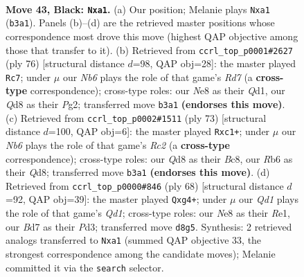 \documentclass[11pt]{article}
\begin{document}
\clearpage

\begin{figure}[p]\centering
\begin{subfigure}{0.46\textwidth}\centering
\resizebox{\linewidth}{!}{%
\newchessgame
\chessboard[
  setfen={B2qn3/3b2k1/pr6/P3Pp1p/3P2p1/NnQ5/5PPP/R3K1N1 b - - 0 43},
  showmover=false,
  pgfstyle=straightmove, color=movearrow, markmove={b3-a1}
]}
\caption{}
\end{subfigure}\hfill
\begin{subfigure}{0.46\textwidth}\centering
\resizebox{\linewidth}{!}{%
\newchessgame
\chessboard[
  setfen={6k1/3R1npp/2q2pn1/B1p4N/p1P1p3/r3P2P/5PP1/3Q2K1 w - - 0 39},
  showmover=false,
  pgfstyle=straightmove, color=movearrow, markmove={d7-c7}
]}
\caption{}
\end{subfigure}
\\[4pt]
\begin{subfigure}{0.46\textwidth}\centering
\resizebox{\linewidth}{!}{%
\newchessgame
\chessboard[
  setfen={2bq4/2r3k1/p2p1np1/1p1Pp1Np/1P2P3/PB6/3Q1PP1/2R3K1 b - - 1 37},
  showmover=false,
  pgfstyle=straightmove, color=movearrow, markmove={c7-c1}
]}
\caption{}
\end{subfigure}\hfill
\begin{subfigure}{0.46\textwidth}\centering
\resizebox{\linewidth}{!}{%
\newchessgame
\chessboard[
  setfen={6k1/3b1p2/r4q2/1pp2n2/3p1BpN/P2P2P1/5P2/3QR1K1 w - - 0 35},
  showmover=false,
  pgfstyle=straightmove, color=movearrow, markmove={d1-g4}
]}
\caption{}
\end{subfigure}
\caption{\textbf{Move 43, Black: \texttt{Nxa1}.} (a) Our position; Melanie plays \texttt{Nxa1} (\texttt{b3a1}). Panels (b)--(d) are the retrieved master positions whose correspondence most drove this move (highest QAP objective among those that transfer to it). (b) Retrieved from \texttt{ccrl\_top\_p0001\#2627} (ply 76) [structural distance $d$=98, QAP obj=28]: the master played \texttt{Rc7}; under $\mu$ our \emph{Nb6} plays the role of that game's \emph{Rd7} (a \textbf{cross-type} correspondence); cross-type roles: our \emph{N}e8 as their \emph{Q}d1, our \emph{Q}d8 as their \emph{P}g2; transferred move \texttt{b3a1} \textbf{(endorses this move)}. (c) Retrieved from \texttt{ccrl\_top\_p0002\#1511} (ply 73) [structural distance $d$=100, QAP obj=6]: the master played \texttt{Rxc1+}; under $\mu$ our \emph{Nb6} plays the role of that game's \emph{Rc2} (a \textbf{cross-type} correspondence); cross-type roles: our \emph{Q}d8 as their \emph{B}c8, our \emph{R}b6 as their \emph{Q}d8; transferred move \texttt{b3a1} \textbf{(endorses this move)}. (d) Retrieved from \texttt{ccrl\_top\_p0000\#846} (ply 68) [structural distance $d$=92, QAP obj=39]: the master played \texttt{Qxg4+}; under $\mu$ our \emph{Qd1} plays the role of that game's \emph{Qd1}; cross-type roles: our \emph{N}e8 as their \emph{R}e1, our \emph{B}d7 as their \emph{P}d3; transferred move \texttt{d8g5}. Synthesis: 2 retrieved analogs transferred to \texttt{Nxa1} (summed QAP objective 33, the strongest correspondence among the candidate moves); Melanie committed it via the \texttt{search} selector.}
\label{fig:thought-m85}
\end{figure}
\end{document}
